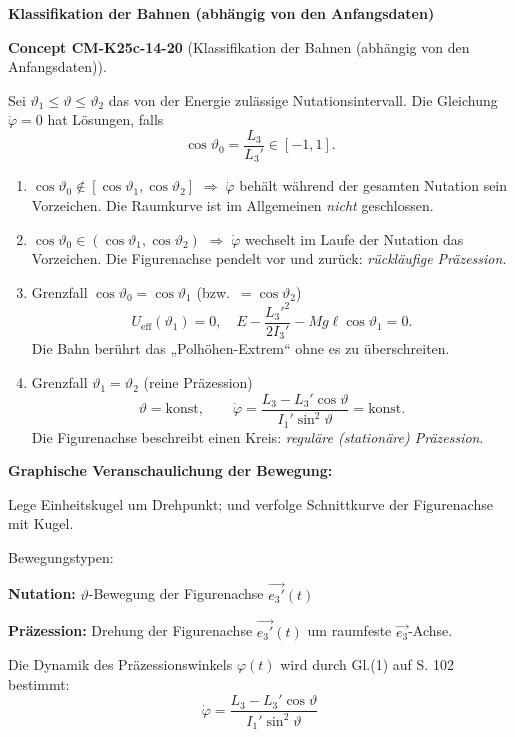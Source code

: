 \documentclass[10pt, letterpaper]{article}
\newcommand{\CustomHeading}[3]{%
  \par\medskip\noindent%
  \textbf{#1 #2} \textnormal{(#3)}.\enskip%
}
\newenvironment{CONC}[2]{\begin{unitbox}\CustomHeading{Concept}{#1}{#2}}{\end{unitbox}}
\begin{document}
\textbf{Klassifikation der Bahnen (abhängig von den Anfangsdaten)}

\begin{CONC}{CM-K25c-14-20}{Klassifikation der Bahnen (abhängig von den Anfangsdaten)}
Sei $\vartheta_1\le\vartheta\le\vartheta_2$ das von der Energie zulässige Nutationsintervall.  
Die Gleichung $\dot\varphi=0$ hat Lösungen, falls
\[
  \cos\vartheta_0=\frac{L_3}{L_3'}\in[-1,1].
\]

\begin{enumerate}
  \item $\cos\vartheta_0\notin[\cos\vartheta_1,\cos\vartheta_2]$  
        $\Rightarrow\;\dot\varphi$ behält während der gesamten Nutation sein Vorzeichen.  
        Die Raumkurve ist im Allgemeinen \emph{nicht} geschlossen.
  \item $\cos\vartheta_0\in(\cos\vartheta_1,\cos\vartheta_2)$  
        $\Rightarrow\;\dot\varphi$ wechselt im Laufe der Nutation das Vorzeichen.  
        Die Figurenachse pendelt vor und zurück: \emph{rückläufige Präzession}.
  \item Grenzfall $\cos\vartheta_0=\cos\vartheta_1$ (bzw.\ $=\cos\vartheta_2$)  
        \[
          U_{\mathrm{eff}}(\vartheta_1)=0,
          \quad
          E-\frac{L_3'^{2}}{2I_3'}-Mg\ell\cos\vartheta_1=0.
        \] 
        Die Bahn berührt das „Polhöhen-Extrem“ ohne es zu überschreiten.
  \item Grenzfall $\vartheta_1=\vartheta_2$ (reine Präzession)  
        \[
          \vartheta=\text{konst},
          \qquad
          \dot\varphi=\frac{L_3-L_3'\cos\vartheta}{I_1'\sin^{2}\vartheta}=\text{konst}.
        \]
        Die Figurenachse beschreibt einen Kreis: \emph{reguläre (stationäre) Präzession}.
\end{enumerate}
\end{CONC}



\textbf{Graphische Veranschaulichung der Bewegung:}

Lege Einheitskugel um Drehpunkt; und verfolge Schnittkurve der Figurenachse mit Kugel.

Bewegungstypen:

\textbf{Nutation:} $\vartheta$-Bewegung der Figurenachse $\vec{e_3'}(t)$

\textbf{Präzession:} Drehung der Figurenachse $\vec{e_3'}(t)$ um raumfeste $\vec{e_3}$-Achse.

Die Dynamik des Präzessionswinkels $\varphi(t)$ wird durch Gl.(1) auf S. 102 bestimmt:
\[\dot{\varphi} = \frac{L_3-L_3' \cos\vartheta}{I_1' \sin^2\vartheta}\]
\end{document}
